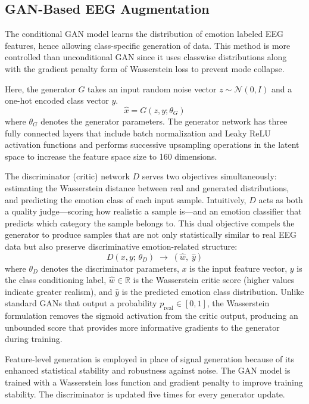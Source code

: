\documentclass[conference]{IEEEtran}
\begin{document}
\subsection{GAN-Based EEG Augmentation}

The conditional GAN model learns the distribution of emotion labeled EEG features, hence allowing class-specific generation of data. This method is more controlled than unconditional GAN since it uses classwise distributions along with the gradient penalty form of Wasserstein loss to prevent mode collapse.

Here, the generator $G$ takes an input random noise vector $z \sim \mathcal{N}(0, I)$ and a one-hot encoded class vector $y$.
\begin{equation}
\label{eq:generator}
\hat{x} = G(z, y; \theta_G)
\end{equation}
where $\theta_G$ denotes the generator parameters. The generator network has three fully connected layers that include batch normalization and Leaky ReLU activation functions and performs successive upsampling operations in the latent space to increase the feature space size to 160 dimensions.

The discriminator (critic) network $D$ serves two objectives simultaneously: estimating the Wasserstein distance between real and generated distributions, and predicting the emotion class of each input sample. Intuitively, $D$ acts as both a quality judge---scoring how realistic a sample is---and an emotion classifier that predicts which category the sample belongs to. This dual objective compels the generator to produce samples that are not only statistically similar to real EEG data but also preserve discriminative emotion-related structure:
\begin{equation}
\label{eq:discriminator}
D(x, y;\, \theta_D) \;\rightarrow\; (\hat{w},\; \hat{y})
\end{equation}
where $\theta_D$ denotes the discriminator parameters, $x$ is the input feature vector, $y$ is the class conditioning label, $\hat{w} \in \mathbb{R}$ is the Wasserstein critic score (higher values indicate greater realism), and $\hat{y}$ is the predicted emotion class distribution. Unlike standard GANs that output a probability $p_{\text{real}} \in [0, 1]$, the Wasserstein formulation removes the sigmoid activation from the critic output, producing an unbounded score that provides more informative gradients to the generator during training.

Feature-level generation is employed in place of signal generation because of its enhanced statistical stability and robustness against noise. The GAN model is trained with a Wasserstein loss function and gradient penalty to improve training stability. The discriminator is updated five times for every generator update.
\end{document}
